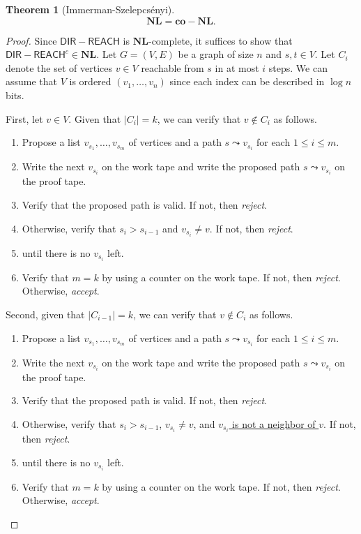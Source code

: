 \documentclass[10pt,letterpaper,cm]{nupset}
\theoremstyle{definition}
\theoremstyle{theorem}
\newtheorem{theorem}[definition]{Theorem}
\theoremstyle{remark}
\newcommand{\1}{\mathbf{1}}
\newcommand{\0}{\vec 0}
\begin{document}
\begin{theorem}[Immerman-Szelepcs\'enyi]
$$\mathbf{NL} = \mathbf{co}{-}{\mathbf{NL}}.$$
\end{theorem}
\begin{proof}
Since $\mathsf{DIR{-}REACH}$ is $\mathbf{NL}$-complete, it suffices to show that $\mathsf{DIR{-}REACH}^c\in \mathbf{NL}.$  
Let $G= \left(V, E\right)$ be a graph of size $n$ and $s, t\in V$. Let $C_i$ denote the set of vertices $v\in V$ reachable from $s$ in at most $i$ steps. We can assume that $V$ is ordered $\left(v_1, \ldots, v_n\right)$ since each index can be described in $\log{n}$ bits.

\medskip

First, let $v\in V$. Given that $\left\lvert{C_i}\right\rvert = k$, we can verify that $v \notin C_i$ as follows. 
\begin{enumerate}
\item Propose a list $v_{s_1}, \ldots, v_{s_m}$ of vertices and a path $s\leadsto v_{s_i}$ for each $1\leq i \leq m$. 
\item Write the next $v_{s_i}$ on the work tape and write the proposed path $s \leadsto v_{s_i}$ on the proof tape. 
\item Verify that the proposed path is valid. If not, then \textit{reject}.
\item Otherwise, verify that $s_i > s_{i-1}$ and $v_{s_i} \ne v$. If not, then \textit{reject}. 
\item {} until there is no $v_{s_i}$ left. 
\item Verify that $m = k$ by using a counter on the work tape. If not, then \textit{reject}. Otherwise, \textit{accept}.
\end{enumerate}

Second, given that $\left\lvert{C_{i-1}}\right\rvert = k$,  we can verify that $v\notin C_i$ as follows.
\begin{enumerate}
\item Propose a list $v_{s_1}, \ldots, v_{s_m}$ of vertices and a path $s\leadsto v_{s_i}$ for each $1\leq i \leq m$. 
\item Write the next $v_{s_i}$ on the work tape and write the proposed path $s \leadsto v_{s_i}$ on the proof tape. 
\item Verify that the proposed path is valid. If not, then \textit{reject}.
\item Otherwise, verify that $s_i > s_{i-1}$, $v_{s_i} \ne v$, and \underline{$v_{s_i}$ is not a neighbor of $v$}. If not, then \textit{reject}. 
\item {} until there is no $v_{s_i}$ left. 
\item Verify that $m = k$ by using a counter on the work tape. If not, then \textit{reject}. Otherwise, \textit{accept}.
\end{enumerate}


\end{proof}
\end{document}
